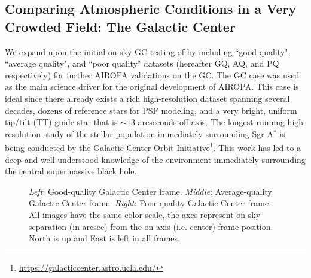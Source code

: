 \documentclass[]{spie}  %
\begin{document}
\subsection{Comparing Atmospheric Conditions in a Very Crowded Field: The Galactic Center} \label{sec:gc-data}
We expand upon the initial on-sky GC testing of \cite{Turri:inprep} by including ``good quality", ``average quality", and ``poor quality" datasets (hereafter GQ, AQ, and PQ respectively) for further AIROPA validations on the GC. The GC case was used as the main science driver for the original development of AIROPA. This case is ideal since there already exists a rich high-resolution dataset spanning several decades, dozens of reference stars for PSF modeling, and a very bright, uniform tip/tilt (TT) guide star that is ${\sim}13$ arcseconds off-axis. The longest-running high-resolution study of the stellar population immediately surrounding Sgr A$^{*}$ is being conducted by the Galactic Center Orbit Initiative\footnote[1]{\url{https://galacticcenter.astro.ucla.edu/}}.
This work has led to a deep and well-understood knowledge \cite{ghez:2005b, ghez:2008a, lu:2008a, do:2019a, gautam:2019a} of the environment immediately surrounding the central supermassive black hole.

\begin{figure}[!h]
 \caption{\footnotesize \textit{Left}: Good-quality Galactic Center frame. \textit{Middle}: Average-quality Galactic Center frame. \textit{Right}: Poor-quality Galactic Center frame. All images have the same color scale, the axes represent on-sky separation (in arcsec) from the on-axis (i.e. center) frame position. North is up and East is left in all frames. \label{fig:gc_images}}
\end{figure}
\end{document}
